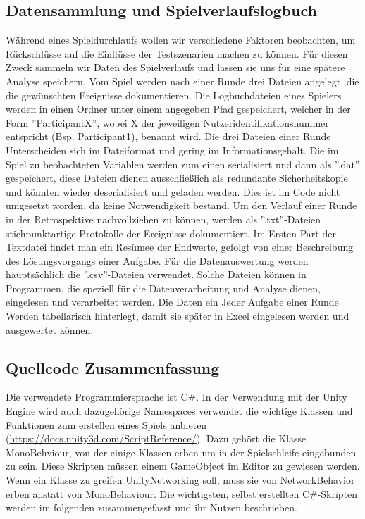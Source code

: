 \subsection{Datensammlung und Spielverlaufslogbuch}
Während eines Spieldurchlaufs wollen wir verschiedene Faktoren beobachten, um Rückschlüsse auf die Einflüsse der Testszenarien  machen zu können. Für diesen Zweck sammeln wir  Daten des Spielverlaufs und lassen sie uns für eine spätere Analyse speichern. Vom Spiel werden nach einer Runde drei Dateien angelegt, die die gewünschten Ereignisse dokumentieren. Die Logbuchdateien eines Spielers werden in einen Ordner unter einem angegeben Pfad gespeichert, welcher in der Form ''ParticipantX'', wobei X der jeweiligen Nutzeridentifikationsnummer entspricht (Bsp. Participant1), benannt wird. Die drei Dateien einer Runde Unterscheiden sich im Dateiformat und gering  im Informationsgehalt. Die im Spiel zu beobachteten Variablen werden zum einen serialisiert und dann als ''.dat'' gespeichert, diese Dateien dienen ausschließlich als redundante Sicherheitskopie und könnten wieder deserialisiert und  geladen werden. Dies ist im Code nicht umgesetzt worden, da keine Notwendigkeit bestand.\newline
Um den Verlauf einer Runde in der Retrospektive nachvollziehen zu können, werden als ''.txt''-Dateien stichpunktartige Protokolle der Ereignisse dokumentiert. Im Ersten Part der Textdatei findet man ein Resümee der Endwerte, gefolgt von einer Beschreibung des Lösungsvorgangs einer Aufgabe.\newline
Für die Datenauswertung  werden hauptsächlich die ''.csv''-Dateien verwendet. Solche Dateien können in Programmen, die speziell für die Datenverarbeitung  und Analyse dienen, eingelesen und verarbeitet werden. Die Daten ein Jeder Aufgabe einer Runde Werden tabellarisch hinterlegt, damit sie später in Excel eingelesen werden und ausgewertet können.
 
\subsection{Quellcode Zusammenfassung}
Die verwendete Programmiersprache ist C\#. In der Verwendung mit der Unity Engine wird auch dazugehörige Namespaces verwendet die wichtige Klassen und Funktionen zum erstellen eines Spiels anbieten (\url{https://docs.unity3d.com/ScriptReference/}). Dazu gehört die Klasse MonoBehviour, von der einige Klassen erben um in der Spielschleife eingebunden zu sein. Diese Skripten müssen einem GameObject im Editor zu gewiesen werden. Wenn ein Klasse zu greifen UnityNetworking  soll, muss sie von NetworkBehavior erben anstatt von MonoBehaviour. Die wichtigsten, selbst erstellten C\#-Skripten werden im folgenden zusammengefasst und ihr Nutzen beschrieben.

